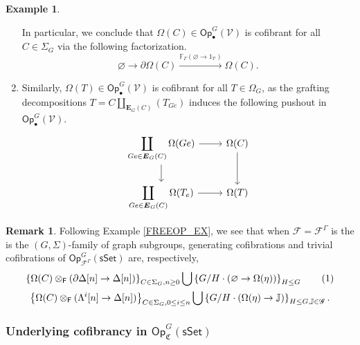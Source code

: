 \documentclass[a4paper,10pt
,draft
]{article}%
\numberwithin{equation}{section}
\numberwithin{figure}{section}
\theoremstyle{definition} %
\newtheorem{example}[equation]{Example}%
\newtheorem{remark}[equation]{Remark}%
\newcommand{\set}[1]{\left\{#1\right\}}%
\newcommand{\Fin}{\mathsf{F}}%
\newcommand{\sSet}{\ensuremath{\mathsf{sSet}}}%
\newcommand{\Op}{\mathsf{Op}}%
\newcommand{\F}{\ensuremath{\mathcal F}}
\newcommand{\V}{\ensuremath{\mathcal V}}
\newcommand{\1}{\ensuremath{\mathbbm 1}}%
\begin{document}
\begin{example}
\begin{enumerate}[label = (\roman*)]
		In particular, we conclude that $\Omega(C) \in \Op^G_\bullet(\V)$ is cofibrant for all $C \in \Sigma_G$ via the following factorization.
		\[
		\varnothing \to \partial \Omega(C) \xrightarrow{\mathbb F_{\Gamma}(\varnothing \to 1_\V)} \Omega(C).
		\]
		\item Similarly, $\Omega(T) \in \Op^G_\bullet(\V)$ is cofibrant for all $T \in \Omega_G$, as
		the grafting decompositions $T = C \coprod_{\boldsymbol{E}_G(C)} (T_{Ge})$ induces the following pushout in $\Op^G_\bullet(\V)$.
		\[
		\begin{tikzcd}
		\displaystyle{
			\coprod_{Ge \in \boldsymbol{E}_G(C)} \Omega(Ge)}
		\arrow[r] \arrow[d]
		&
		\Omega(C) \arrow[d]
		\\
		\displaystyle{
			\coprod_{Ge \in \boldsymbol{E}_G(C)} \Omega(T_e)}
		\arrow[r]
		&
		\Omega(T)
		\end{tikzcd}
		\]            
	\end{enumerate}
\end{example}


\begin{remark}
	Following Example \ref{FREEOP_EX}, we see that
	when $\F = \F^\Gamma$ is the is the $(G, \Sigma)$-family of graph subgroups,
	generating cofibrations and trivial cofibrations of $\Op^G_{\F^\Gamma}(\sSet)$ are, respectively, 
	\begin{gather*}
	\set{\Omega(C) \otimes_\Fin(\partial \Delta[n] \to \Delta[n])}_{C \in \Sigma_G, n \geq 0} \bigcup 
	\set{G/H \cdot (\varnothing \to \Omega(\eta))}_{H \leq G}
	\stepcounter{equation}\tag{\theequation}\label{SSETGENCOF_EQ}
	\\
	\set{\Omega(C) \otimes_\Fin(\Lambda^i[n] \to \Delta[n])}_{C \in \Sigma_G, 0 \leq i \leq n} \bigcup
	\set{G/H \cdot (\Omega(\eta) \to \mathbb J)}_{H \leq G, \mathbb J \in \mathscr G}.
	\end{gather*}     
\end{remark}













\subsubsection*{Underlying cofibrancy in $\Op^G_{\mathfrak C}(\sSet)$}
\end{document}
